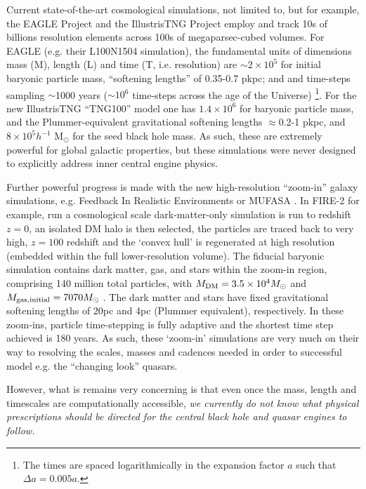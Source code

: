 \smallskip
\smallskip
\noindent
Current state-of-the-art cosmological simulations, not limited to,
but for example, the EAGLE Project \citep{Schaye2015, Crain2015} and
the IllustrisTNG Project \citep{Pillepich2018} employ and track 10s of
billions resolution elements across 100s of megaparsec-cubed volumes.
For EAGLE (e.g. their L100N1504 simulation), the fundamental units of
dimensions mass (M), length (L) and time (T, i.e. resolution) are
$\sim2\times10^{5}$ for initial baryonic particle mass, ``softening
lengths'' of 0.35-0.7 pkpc; and and time-steps sampling $\sim$1000
years ($\sim10^{6}$ time-steps across the age of the Universe)
\footnote{The times are spaced logarithmically in the expansion factor
$a$ such that $\Delta a = 0.005a$.}.  For the new IllustrisTNG
``TNG100'' model one has $1.4\times10^{6}$ for baryonic particle mass,
and the Plummer-equivalent gravitational softening lengths
$\approx$0.2-1 pkpc, and $8\times10^{5} h^{-1}$ M$_{\odot}$ for the
seed black hole mass.  As such, these are extremely powerful for
global galactic properties, but these simulations were never designed
to explicitly address inner central engine physics.

\smallskip
\smallskip
\noindent
Further powerful progress is made with the new high-resolution
``zoom-in'' galaxy simulations, e.g. Feedback In Realistic
Environments \citep[FIRE-2; ][]{Wetzel2016, Hopkins2017} or MUFASA
\citep[][]{Dave2016}.  In FIRE-2 for example, \citet{Wetzel2016} run a
cosmological scale dark-matter-only simulation is run to redshift
$z=0$, an isolated DM halo is then selected, the particles are traced
back to very high, $z=100$ redshift and the `convex hull' is
regenerated at high resolution (embedded within the full
lower-resolution volume).  The fiducial baryonic simulation contains
dark matter, gas, and stars within the zoom-in region, comprising 140
million total particles, with $M_{\rm DM} =3.5\times10^{4} M_{\odot}$
and $M_{\rm gas,initial} = 7070 M_{\odot}$ .  The dark matter and
stars have fixed gravitational softening lengths of 20pc and 4pc
(Plummer equivalent), respectively.  In these zoom-ins, particle
time-stepping is fully adaptive and the shortest time step achieved is
180 years.  As such, these `zoom-in' simulations are very much on
their way to resolving the scales, masses and cadences needed in order
to successful model e.g. the ``changing look'' quasars.

\smallskip
\smallskip
\noindent
However, what is remains very concerning is that even once the 
mass, length and timescales are computationally accessible, {\it we 
currently do not know what physical prescriptions should be 
directed for the central black hole and quasar engines to follow.}


